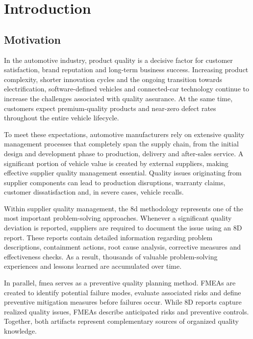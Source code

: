 \chapter{Introduction}\label{ch:intro}


\section{Motivation}\label{sec:intro_motivation}

In the automotive industry, product quality is a decisive factor for customer satisfaction, brand reputation and long-term business success. Increasing product complexity, shorter innovation cycles and the ongoing transition towards electrification, software-defined vehicles and connected-car technology continue to increase the challenges associated with quality assurance. At the same time, customers expect premium-quality products and near-zero defect rates throughout the entire vehicle lifecycle.

To meet these expectations, automotive manufacturers rely on extensive quality management processes that completely span the supply chain, from the initial design and development phase to production, delivery and after-sales service. A significant portion of vehicle value is created by external suppliers, making effective supplier quality management essential. Quality issues originating from supplier components can lead to production disruptions, warranty claims, customer dissatisfaction and, in severe cases, vehicle recalls.

Within supplier quality management, the \ac{8d} methodology represents one of the most important problem-solving approaches. Whenever a significant quality deviation is reported, suppliers are required to document the issue using an 8D report. These reports contain detailed information regarding problem descriptions, containment actions, root cause analysis, corrective measures and effectiveness checks. As a result, thousands of valuable problem-solving experiences and lessons learned are accumulated over time.

In parallel, \ac{fmea} serves as a preventive quality planning method. FMEAs are created to identify potential failure modes, evaluate associated risks and define preventive mitigation measures before failures occur. While 8D reports capture realized quality issues, FMEAs describe anticipated risks and preventive controls. Together, both artifacts represent complementary sources of organized quality knowledge.


